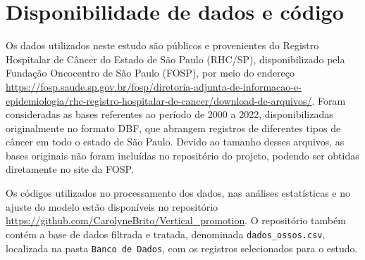 \documentclass[11pt,a4paper]{article}
\begin{document}
\section{Disponibilidade de dados e código}

Os dados utilizados neste estudo são públicos e provenientes do Registro Hospitalar de Câncer do Estado de São Paulo (RHC/SP), disponibilizado pela Fundação Oncocentro de São Paulo (FOSP), por meio do endereço \url{https://fosp.saude.sp.gov.br/fosp/diretoria-adjunta-de-informacao-e-epidemiologia/rhc-registro-hospitalar-de-cancer/download-de-arquivos/}. Foram consideradas as bases referentes ao período de 2000 a 2022, disponibilizadas originalmente no formato DBF, que abrangem registros de diferentes tipos de câncer em todo o estado de São Paulo. Devido ao tamanho desses arquivos, as bases originais não foram incluídas no repositório do projeto, podendo ser obtidas diretamente no site da FOSP.

Os códigos utilizados no processamento dos dados, nas análises estatísticas e no ajuste do modelo estão disponíveis no repositório \url{https://github.com/CarolyneBrito/Vertical_promotion}. O repositório também contém a base de dados filtrada e tratada, denominada \texttt{dados\_ossos.csv}, localizada na pasta \texttt{Banco de Dados}, com os registros selecionados para o estudo.  




\end{document}
